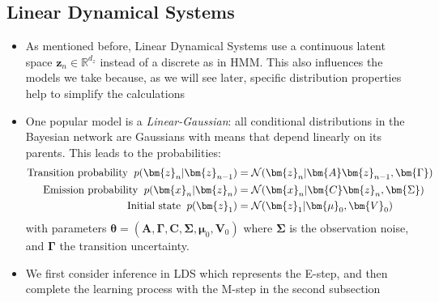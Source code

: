 \subsection{Linear Dynamical Systems}
\begin{itemize}
	\item As mentioned before, Linear Dynamical Systems use a continuous latent space $\bm{z}_n\in \mathbb{R}^{d_z}$ instead of a discrete as in HMM. This also influences the models we take because, as we will see later, specific distribution properties help to simplify the calculations
	\item One popular model is a \textit{Linear-Gaussian}: all conditional distributions in the Bayesian network are Gaussians with means that depend linearly on its parents. This leads to the probabilities:
	\begin{equation*}
		\begin{split}
			\text{Transition probability}\hspace{2mm} p(\bm{z}_n|\bm{z}_{n-1}) & = \mathcal{N}(\bm{z}_n|\bm{A}\bm{z}_{n-1}, \bm{\Gamma})\\
			\text{Emission probability}\hspace{2mm} p(\bm{x}_n|\bm{z}_n) & = \mathcal{N}(\bm{x}_n|\bm{C}\bm{z}_n, \bm{\Sigma})\\
			\text{Initial state}\hspace{2mm} p(\bm{z}_1)  & = \mathcal{N}(\bm{z}_1|\bm{\mu}_0, \bm{V}_0)
		\end{split}
	\end{equation*}
	with parameters $\bm{\theta}=(\bm{A}, \bm{\Gamma}, \bm{C}, \bm{\Sigma}, \bm{\mu}_0, \bm{V}_0)$ where $\bm{\Sigma}$ is the observation noise, and $\bm{\Gamma}$ the transition uncertainty.
	\item We first consider inference in LDS which represents the E-step, and then complete the learning process with the M-step in the second subsection
\end{itemize}
